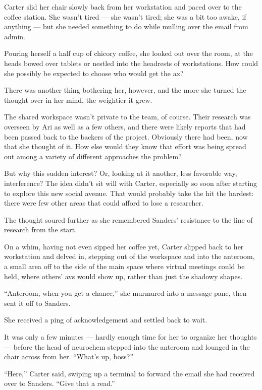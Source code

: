 Carter slid her chair slowly back from her workstation and paced over to the coffee station. She wasn't tired --- she wasn't tired; she was a bit too awake, if anything --- but she needed something to do while mulling over the email from admin.

Pouring herself a half cup of chicory coffee, she looked out over the room, at the heads bowed over tablets or nestled into the headrests of workstations. How could she possibly be expected to choose who would get the ax?

There was another thing bothering her, however, and the more she turned the thought over in her mind, the weightier it grew.

The shared workspace wasn't private to the team, of course. Their research was overseen by Ari as well as a few others, and there were likely reports that had been passed back to the backers of the project. Obviously there had been, now that she thought of it. How else would they know that effort was being spread out among a variety of different approaches the problem?

But why this sudden interest? Or, looking at it another, less favorable way, interference? The idea didn't sit will with Carter, especially so soon after starting to explore this new social avenue. That would probably take the hit the hardest: there were few other areas that could afford to lose a researcher.

The thought soured further as she remembered Sanders' resistance to the line of research from the start.

On a whim, having not even sipped her coffee yet, Carter slipped back to her workstation and delved in, stepping out of the workspace and into the anteroom, a small area off to the side of the main space where virtual meetings could be held, where others' avs would show up, rather than just the shadowy shapes.

``Anteroom, when you get a chance,'' she murmured into a message pane, then sent it off to Sanders.

She received a ping of acknowledgement and settled back to wait.

It was only a few minutes --- hardly enough time for her to organize her thoughts --- before the head of neurochem stepped into the anteroom and lounged in the chair across from her. ``What's up, boss?''

``Here,'' Carter said, swiping up a terminal to forward the email she had received over to Sanders. ``Give that a read.''

